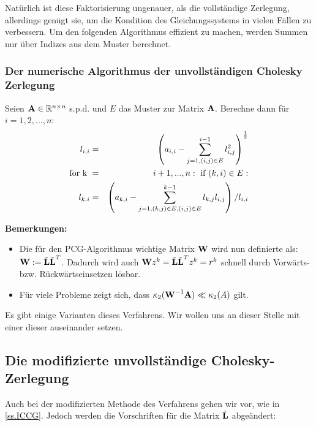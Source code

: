 Natürlich ist diese Faktorisierung ungenauer, als die vollständige Zerlegung, allerdings genügt sie, um die Kondition des Gleichungssystems in vielen Fällen zu verbessern. Um den folgenden Algorithmus effizient zu machen, werden Summen nur über Indizes aus dem Muster berechnet.

\subsubsection{Der numerische Algorithmus der unvollständigen Cholesky Zerlegung}\label{sss.Cholesky-Algorithmus}

Seien ${\textbf{A}} \in \mathbb{R}^{n \times n}$ s.p.d. und $E$ das Muster zur Matrix ${\textbf{A}}$. Berechne dann für $i=1,2,...,n$:
\begin{eqnarray}
l_{i,i} &=& \left( a_{i,i} - \sum^{i-1}_{j=1,(i,j) \in E} l_{i,j}^{2} \right)^{\frac {1} {2}} \\
\textnormal{for k } &=& i+1,...,n: \textnormal{ if } (k,i) \in E: \\
l_{k,i} &=& \left( a_{k,i} - \sum^{k-1}_{j=1,(k,j) \in E, (i,j) \in E} l_{k,j} l_{i,j} \right) / l_{i,i}
\end{eqnarray}

\textbf{Bemerkungen:}

\begin{itemize}
\item Die für den PCG-Algorithmus wichtige Matrix ${\textbf{W}}$ wird nun definierte als: ${\textbf{W}} := \tilde{{\textbf{L}}} \tilde{{\textbf{L}}}^{T}$. Dadurch wird auch ${\textbf{W}}z^{k} = \tilde{{\textbf{L}}} \tilde{{\textbf{L}}}^{T}z^{k} = r^{k}$ schnell durch Vorwärts- bzw. Rückwärtseinsetzen lösbar.
\item Für viele Probleme zeigt sich, dass $\kappa_{2}({\textbf{W}}^{-1} {\textbf{A}}) \ll \kappa_{2} (A)$ gilt. \\
\end{itemize}

Es gibt einige Varianten dieses Verfahrens. Wir wollen uns an dieser Stelle mit einer dieser auseinander setzen.

\subsection{Die modifizierte unvollständige Cholesky-Zerlegung}\label{ss.Modifizierte Cholesky}

Auch bei der modifizierten Methode des Verfahrens gehen wir vor, wie in \autoref{ss.ICCG}. Jedoch werden die Vorschriften für die Matrix $\tilde{{\textbf{L}}}$ abgeändert:

